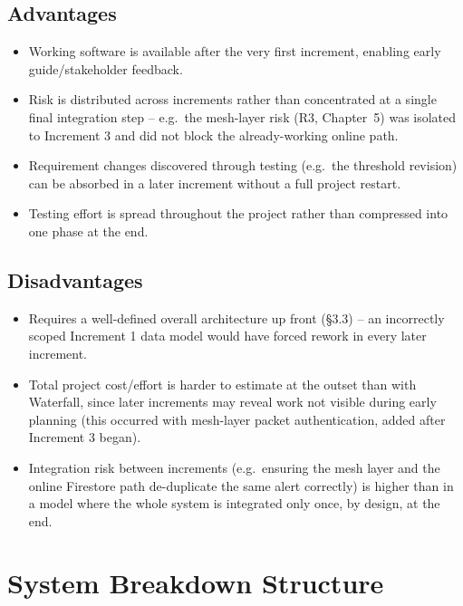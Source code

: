 \documentclass[12pt,a4paper,oneside]{report}
\begin{document}
\subsection{Advantages}
\begin{itemize}
  \item Working software is available after the very first increment,
        enabling early guide/stakeholder feedback.
  \item Risk is distributed across increments rather than concentrated at a
        single final integration step -- e.g.\ the mesh-layer risk (R3,
        Chapter~5) was isolated to Increment 3 and did not block the
        already-working online path.
  \item Requirement changes discovered through testing (e.g.\ the threshold
        revision) can be absorbed in a later increment without a full
        project restart.
  \item Testing effort is spread throughout the project rather than
        compressed into one phase at the end.
\end{itemize}

\subsection{Disadvantages}
\begin{itemize}
  \item Requires a well-defined overall architecture up front (\S3.3) --
        an incorrectly scoped Increment 1 data model would have forced
        rework in every later increment.
  \item Total project cost/effort is harder to estimate at the outset than
        with Waterfall, since later increments may reveal work not visible
        during early planning (this occurred with mesh-layer packet
        authentication, added after Increment 3 began).
  \item Integration risk between increments (e.g.\ ensuring the mesh layer
        and the online Firestore path de-duplicate the same alert
        correctly) is higher than in a model where the whole system is
        integrated only once, by design, at the end.
\end{itemize}

\section{System Breakdown Structure}
\end{document}
